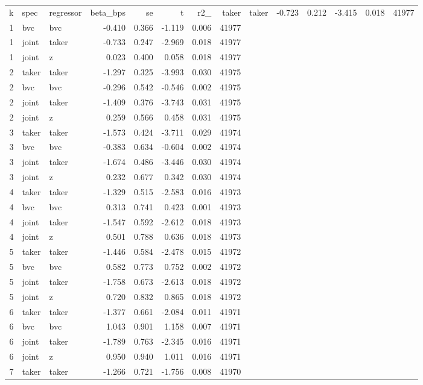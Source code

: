 \begin{tabular}{rllrrrrr}
\toprule
k & spec & regressor & beta_bps & se & t & r2_%
 & taker & taker & -0.723 & 0.212 & -3.415 & 0.018 & 41977 \\
1 & bvc & bvc & -0.410 & 0.366 & -1.119 & 0.006 & 41977 \\
1 & joint & taker & -0.733 & 0.247 & -2.969 & 0.018 & 41977 \\
1 & joint & z & 0.023 & 0.400 & 0.058 & 0.018 & 41977 \\
2 & taker & taker & -1.297 & 0.325 & -3.993 & 0.030 & 41975 \\
2 & bvc & bvc & -0.296 & 0.542 & -0.546 & 0.002 & 41975 \\
2 & joint & taker & -1.409 & 0.376 & -3.743 & 0.031 & 41975 \\
2 & joint & z & 0.259 & 0.566 & 0.458 & 0.031 & 41975 \\
3 & taker & taker & -1.573 & 0.424 & -3.711 & 0.029 & 41974 \\
3 & bvc & bvc & -0.383 & 0.634 & -0.604 & 0.002 & 41974 \\
3 & joint & taker & -1.674 & 0.486 & -3.446 & 0.030 & 41974 \\
3 & joint & z & 0.232 & 0.677 & 0.342 & 0.030 & 41974 \\
4 & taker & taker & -1.329 & 0.515 & -2.583 & 0.016 & 41973 \\
4 & bvc & bvc & 0.313 & 0.741 & 0.423 & 0.001 & 41973 \\
4 & joint & taker & -1.547 & 0.592 & -2.612 & 0.018 & 41973 \\
4 & joint & z & 0.501 & 0.788 & 0.636 & 0.018 & 41973 \\
5 & taker & taker & -1.446 & 0.584 & -2.478 & 0.015 & 41972 \\
5 & bvc & bvc & 0.582 & 0.773 & 0.752 & 0.002 & 41972 \\
5 & joint & taker & -1.758 & 0.673 & -2.613 & 0.018 & 41972 \\
5 & joint & z & 0.720 & 0.832 & 0.865 & 0.018 & 41972 \\
6 & taker & taker & -1.377 & 0.661 & -2.084 & 0.011 & 41971 \\
6 & bvc & bvc & 1.043 & 0.901 & 1.158 & 0.007 & 41971 \\
6 & joint & taker & -1.789 & 0.763 & -2.345 & 0.016 & 41971 \\
6 & joint & z & 0.950 & 0.940 & 1.011 & 0.016 & 41971 \\
7 & taker & taker & -1.266 & 0.721 & -1.756 & 0.008 & 41970 \\

\end{tabular}
